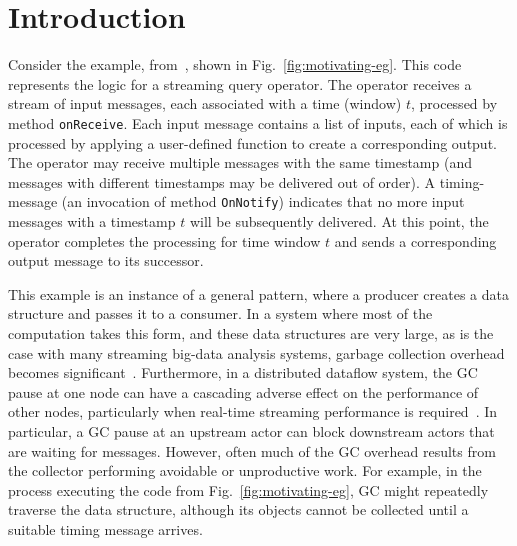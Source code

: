 \newcommand{\TODO}[1]{\textbf{TODO: #1}} \newcommand{\eg}{\emph{e.g.}}
\newcommand{\ie}{\emph{i.e.}}

\section{Introduction} \label{sec:introduction}

Consider the example, from~\cite{Broom:HotOS}, shown in
Fig.~\ref{fig:motivating-eg}.  This code represents the logic for a
streaming query operator.  The operator receives a stream of input
messages, each associated with a time (window) $t$, processed by
method \texttt{onReceive}.  Each input message contains a list of
inputs, each of which is processed by applying a user-defined function
to create a corresponding output.  The operator may receive multiple
messages with the same timestamp (and messages with different
timestamps may be delivered out of order).  A timing-message (an
invocation of method \texttt{OnNotify}) indicates that no more input
messages with a timestamp $t$ will be subsequently delivered.  At this
point, the operator completes the processing for time window $t$ and
sends a corresponding output message to its successor.



This example is an instance of a general pattern, where a producer creates a
data structure and passes it to a consumer. In a system where most of the
computation takes this form, and these data structures are very large, as is
the case with many streaming big-data analysis systems, garbage collection
overhead becomes significant~\cite{Broom:HotOS}.  Furthermore, in a
distributed dataflow system, the GC pause at one node can have a cascading
adverse effect on the performance of other nodes, particularly when real-time
streaming performance is required~\cite{Broom:HotOS, harris15}.  In
particular, a GC pause at an upstream actor can block downstream actors that
are waiting for messages.  However, often much of the GC overhead results
from the collector performing avoidable or unproductive work.  For example,
in the process executing the code from Fig.~\ref{fig:motivating-eg}, GC might
repeatedly traverse the  data structure, although its objects cannot
be collected until a suitable timing message arrives.


